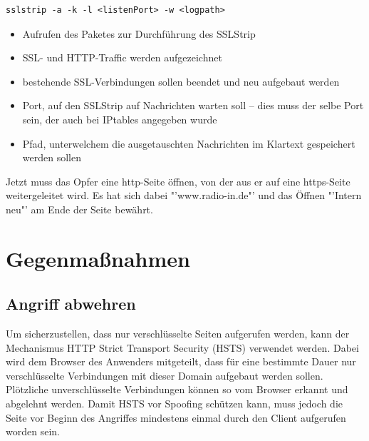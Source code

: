 \begin{lstlisting}
sslstrip -a -k -l <listenPort> -w <logpath>
\end{lstlisting}

\begin{itemize}
	\item {} Aufrufen des Paketes zur Durchführung des SSLStrip
	\item {} SSL- und HTTP-Traffic werden aufgezeichnet
	\item {} bestehende SSL-Verbindungen sollen beendet und neu aufgebaut werden
	\item {} Port, auf den SSLStrip auf Nachrichten warten soll -- dies muss der selbe Port sein, der auch bei IPtables angegeben wurde
	\item {} Pfad, unterwelchem die ausgetauschten Nachrichten im Klartext gespeichert werden sollen
\end{itemize}

Jetzt muss das Opfer eine http-Seite öffnen, von der aus er auf eine https-Seite weitergeleitet wird. Es hat sich dabei "'www.radio-in.de"' und das Öffnen "'Intern neu"' am Ende der Seite bewährt.

\section{Gegenmaßnahmen}

\subsection{Angriff abwehren}
Um sicherzustellen, dass nur verschlüsselte Seiten aufgerufen werden, kann der Mechanismus HTTP Strict Transport Security (HSTS) verwendet werden. Dabei wird dem Browser des Anwenders mitgeteilt, dass für eine bestimmte Dauer nur verschlüsselte Verbindungen mit dieser Domain aufgebaut werden sollen. Plötzliche unverschlüsselte Verbindungen können so vom Browser erkannt und abgelehnt werden. Damit HSTS vor Spoofing schützen kann, muss jedoch die Seite vor Beginn des Angriffes mindestens einmal durch den Client aufgerufen worden sein.